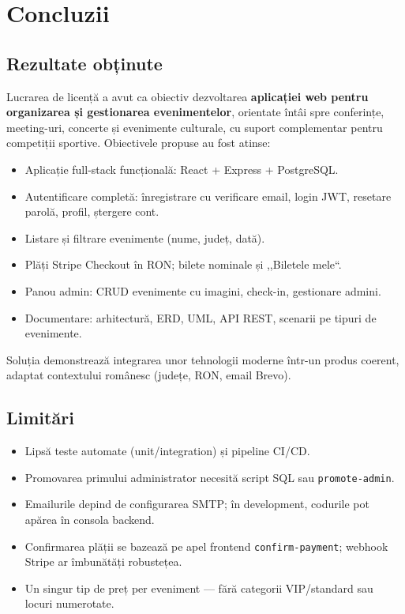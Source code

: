 \chapter{Concluzii}

\section{Rezultate obținute}

Lucrarea de licență a avut ca obiectiv dezvoltarea \textbf{aplicației web pentru organizarea și gestionarea evenimentelor}, orientate întâi spre conferințe, meeting-uri, concerte și evenimente culturale, cu suport complementar pentru competiții sportive. Obiectivele propuse au fost atinse:

\begin{itemize}
	\item Aplicație full-stack funcțională: React + Express + PostgreSQL.
	\item Autentificare completă: înregistrare cu verificare email, login JWT, resetare parolă, profil, ștergere cont.
	\item Listare și filtrare evenimente (nume, județ, dată).
	\item Plăți Stripe Checkout în RON; bilete nominale și ,,Biletele mele``.
	\item Panou admin: CRUD evenimente cu imagini, check-in, gestionare admini.
	\item Documentare: arhitectură, ERD, UML, API REST, scenarii pe tipuri de evenimente.
\end{itemize}

Soluția demonstrează integrarea unor tehnologii moderne într-un produs coerent, adaptat contextului românesc (județe, RON, email Brevo).


\section{Limitări}

\begin{itemize}
	\item Lipsă teste automate (unit/integration) și pipeline CI/CD.
	\item Promovarea primului administrator necesită script SQL sau \texttt{promote-admin}.
	\item Emailurile depind de configurarea SMTP; în development, codurile pot apărea în consola backend.
	\item Confirmarea plății se bazează pe apel frontend \texttt{confirm-payment}; webhook Stripe ar îmbunătăți robustețea.
	\item Un singur tip de preț per eveniment — fără categorii VIP/standard sau locuri numerotate.
\end{itemize}

